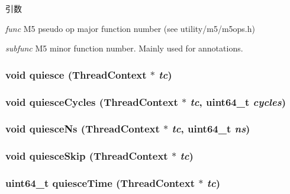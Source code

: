 \begin{DoxyParams}{引数}
\item[{\em func}]M5 pseudo op major function number (see utility/m5/m5ops.h) \item[{\em subfunc}]M5 minor function number. Mainly used for annotations. \end{DoxyParams}
\hypertarget{namespacePseudoInst_a977b8b2deadbfd9c0976dca7b75cfa08}{
\subsubsection[{quiesce}]{\setlength{\rightskip}{0pt plus 5cm}void quiesce ({\bf ThreadContext} $\ast$ {\em tc})}}
\label{namespacePseudoInst_a977b8b2deadbfd9c0976dca7b75cfa08}
\hypertarget{namespacePseudoInst_a70caa4a44963eb294bfddbf67cdfc5d9}{
\subsubsection[{quiesceCycles}]{\setlength{\rightskip}{0pt plus 5cm}void quiesceCycles ({\bf ThreadContext} $\ast$ {\em tc}, \/  uint64\_\-t {\em cycles})}}
\label{namespacePseudoInst_a70caa4a44963eb294bfddbf67cdfc5d9}
\hypertarget{namespacePseudoInst_a1783da8f7e3427cb3656ae88329c9106}{
\subsubsection[{quiesceNs}]{\setlength{\rightskip}{0pt plus 5cm}void quiesceNs ({\bf ThreadContext} $\ast$ {\em tc}, \/  uint64\_\-t {\em ns})}}
\label{namespacePseudoInst_a1783da8f7e3427cb3656ae88329c9106}
\hypertarget{namespacePseudoInst_a73e782e05ef938409cc211fe11a22e5e}{
\subsubsection[{quiesceSkip}]{\setlength{\rightskip}{0pt plus 5cm}void quiesceSkip ({\bf ThreadContext} $\ast$ {\em tc})}}
\label{namespacePseudoInst_a73e782e05ef938409cc211fe11a22e5e}
\hypertarget{namespacePseudoInst_a89bd6a436c203e630bc715feab90fe13}{
\subsubsection[{quiesceTime}]{\setlength{\rightskip}{0pt plus 5cm}uint64\_\-t quiesceTime ({\bf ThreadContext} $\ast$ {\em tc})}}
